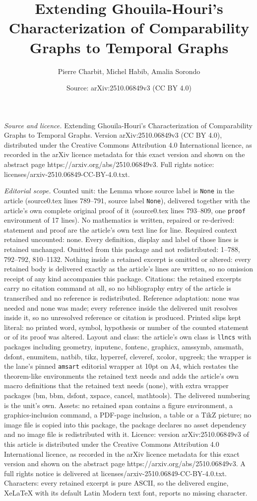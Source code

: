 \documentclass[10pt,a4paper]{amsart}
\title[Extending Ghouila-Houri's Characterization of Comparability ]{Extending Ghouila-Houri's Characterization of Comparability Graphs to Temporal Graphs}
\author{Pierre Charbit, Michel Habib, Amalia Sorondo}
\date{Source: arXiv:2510.06849v3 (CC BY 4.0)}
\begin{document}
\maketitle

\noindent\emph{Source and licence.} Extending Ghouila-Houri's Characterization of Comparability Graphs to Temporal Graphs. Version arXiv:2510.06849v3 (CC BY 4.0), distributed under the Creative Commons Attribution 4.0 International licence, as recorded in the arXiv licence metadata for this exact version and shown on the abstract page https://arxiv.org/abs/2510.06849v3. Full rights notice: licenses/arxiv-2510.06849-CC-BY-4.0.txt.\par\smallskip

\noindent\textit{Editorial scope.} Counted unit: the Lemma whose source label is \texttt{None} in the article (source0.tex lines 789--791, source label \texttt{None}), delivered together with the article's own complete original proof of it (source0.tex lines 793--809, one \texttt{proof} environment of 17 lines). No mathematics is written, repaired or re-derived: statement and proof are the article's own text line for line. Required context retained uncounted: none. Every definition, display and label of those lines is retained unchanged. Omitted from this package and not redistributed: 1--788, 792--792, 810--1132. Nothing inside a retained excerpt is omitted or altered: every retained body is delivered exactly as the article's lines are written, so no omission receipt of any kind accompanies this package. Citations: the retained excerpts carry no citation command at all, so no bibliography entry of the article is transcribed and no reference is redistributed. Reference adaptation: none was needed and none was made; every reference inside the delivered unit resolves inside it, so no unresolved reference or citation is produced. Printed slips kept literal: no printed word, symbol, hypothesis or number of the counted statement or of its proof was altered. Layout and class: the article's own class is \texttt{llncs} with packages including geometry, inputenc, fontenc, graphicx, amssymb, amsmath, dsfont, enumitem, natbib, tikz, hyperref, cleveref, xcolor, upgreek; the wrapper is the lane's pinned \texttt{amsart} editorial wrapper at 10pt on A4, which restates the theorem-like environments the retained text needs and adds the article's own macro definitions that the retained text needs (none), with extra wrapper packages (bm, bbm, dsfont, xspace, cancel, mathtools). The delivered numbering is the unit's own. Assets: no retained span contains a figure environment, a graphics-inclusion command, a PDF-page inclusion, a table or a TikZ picture; no image file is copied into this package, the package declares no asset dependency and no image file is redistributed with it. Licence: version arXiv:2510.06849v3 of this article is distributed under the Creative Commons Attribution 4.0 International licence, as recorded in the arXiv licence metadata for this exact version and shown on the abstract page https://arxiv.org/abs/2510.06849v3. A full rights notice is delivered at licenses/arxiv-2510.06849-CC-BY-4.0.txt. Characters: every retained excerpt is pure ASCII, so the delivered engine, XeLaTeX with its default Latin Modern text font, reports no missing character.
\end{document}
